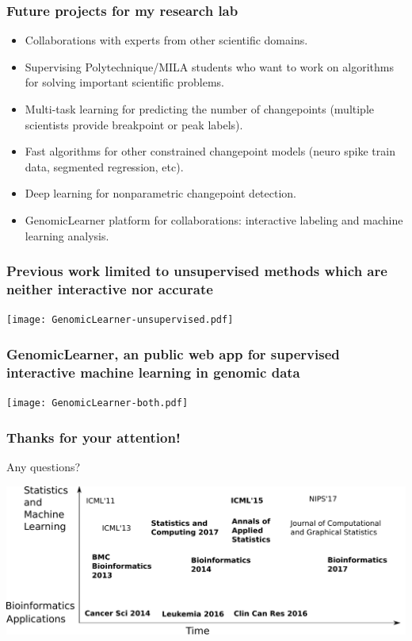 \documentclass{beamer}
\begin{document}
\begin{frame}
  \frametitle{Future projects for my research lab}
  \begin{itemize}
  \item Collaborations with experts from other scientific domains.
  \item Supervising Polytechnique/MILA students who want to work on algorithms
    for solving important scientific problems.
  \item Multi-task learning for predicting the number of changepoints
    (multiple scientists provide breakpoint or peak labels).
  \item Fast algorithms for other constrained changepoint models
    (neuro spike train data, segmented regression, etc).
  \item Deep learning for nonparametric changepoint detection.
  \item GenomicLearner platform for collaborations: interactive
    labeling and machine learning analysis.
  \end{itemize}
\end{frame}

\begin{frame}
  \frametitle{Previous work limited to 
    unsupervised methods
which are neither interactive nor accurate
}
  \texttt{[image: GenomicLearner-unsupervised.pdf]}
\end{frame}

\begin{frame}
  \frametitle{GenomicLearner, an public web app for supervised interactive machine learning in genomic data}
  \texttt{[image: GenomicLearner-both.pdf]}
\end{frame}


\begin{frame}
  \frametitle{Thanks for your attention!}

Any questions?

\hskip 1cm

\includegraphics[width=\textwidth]{timeline-SteJustine}




\end{frame}
\end{document}
